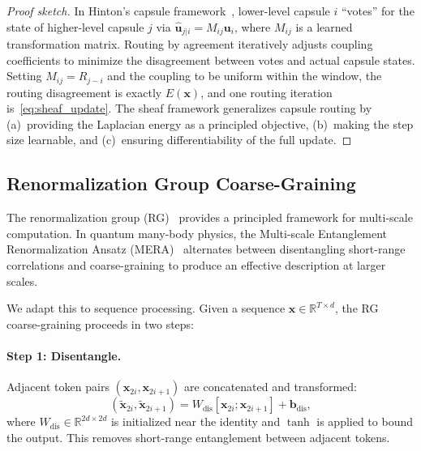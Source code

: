 \documentclass[11pt,a4paper]{article}
\newcommand{\R}{\mathbb{R}}
\begin{document}
\begin{proof}[Proof sketch]
In Hinton's capsule framework~\citep{sabour2017dynamic}, lower-level
capsule $i$ ``votes'' for the state of higher-level capsule $j$ via
$\hat{\bm{u}}_{j|i} = M_{ij} \bm{u}_i$, where $M_{ij}$ is a learned
transformation matrix.  Routing by agreement iteratively adjusts
coupling coefficients to minimize the disagreement between votes and
actual capsule states.  Setting $M_{ij} = R_{j-i}$ and the coupling
to be uniform within the window, the routing disagreement is exactly
$E(\bm{x})$, and one routing iteration is~\eqref{eq:sheaf_update}.
The sheaf framework generalizes capsule routing by (a)~providing the
Laplacian energy as a principled objective, (b)~making the step size
learnable, and (c)~ensuring differentiability of the full update.
\end{proof}

\subsection{Renormalization Group Coarse-Graining}
\label{sec:rg}

The renormalization group (RG)~\citep{wilson1975renormalization}
provides a principled framework for multi-scale computation.  In
quantum many-body physics, the Multi-scale Entanglement
Renormalization Ansatz (MERA)~\citep{vidal2007entanglement}
alternates between disentangling short-range correlations and
coarse-graining to produce an effective description at larger scales.

We adapt this to sequence processing.  Given a sequence
$\bm{x} \in \R^{T \times d}$, the RG coarse-graining proceeds in
two steps:

\paragraph{Step 1: Disentangle.}  Adjacent token pairs
$(\bm{x}_{2i}, \bm{x}_{2i+1})$ are concatenated and transformed:
\begin{equation}
(\tilde{\bm{x}}_{2i}, \tilde{\bm{x}}_{2i+1}) =
  W_{\text{dis}}[\bm{x}_{2i}; \bm{x}_{2i+1}] + \bm{b}_{\text{dis}},
\label{eq:disentangle}
\end{equation}
where $W_{\text{dis}} \in \R^{2d \times 2d}$ is initialized near the
identity and $\tanh$ is applied to bound the output.  This removes
short-range entanglement between adjacent tokens.
\end{document}

